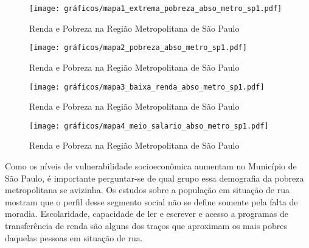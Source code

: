 \documentclass[14pt]{extarticle}
\begin{document}
%
\begin{landscape}
\pagestyle{empty}
\begin{figure}[p]
 \vspace*{-1.2cm}
\centering
	\caption{Renda e Pobreza na Região Metropolitana de São Paulo}
	\texttt{[image: gráficos/mapa1\_extrema\_pobreza\_abso\_metro\_sp1.pdf]}
	\label{fig:mapa_extrema_pobreza}
\end{figure}
\end{landscape}


%
\begin{landscape}
\pagestyle{empty}
\begin{figure}[p]
 \vspace*{-1.2cm}
\centering
	\caption{Renda e Pobreza na Região Metropolitana de São Paulo}
	\texttt{[image: gráficos/mapa2\_pobreza\_abso\_metro\_sp1.pdf]}
	\label{fig:mapa_pobreza}
\end{figure}
\end{landscape}


%
\begin{landscape}
\pagestyle{empty}
\begin{figure}[p]
 \vspace*{-1.2cm}
\centering
	\caption{Renda e Pobreza na Região Metropolitana de São Paulo}
	\texttt{[image: gráficos/mapa3\_baixa\_renda\_abso\_metro\_sp1.pdf]}
	\label{fig:mapa_baixa_renda}
\end{figure}
\end{landscape}


%
\begin{landscape}
\pagestyle{empty}
\begin{figure}[p]
 \vspace*{-1.2cm}
\centering
	\caption{Renda e Pobreza na Região Metropolitana de São Paulo}
	\texttt{[image: gráficos/mapa4\_meio\_salario\_abso\_metro\_sp1.pdf]}
	\label{fig:mapa_meio_salario}
\end{figure}
\end{landscape}

Como os níveis de vulnerabilidade socioeconômica aumentam no Município de São Paulo, é importante perguntar-se de qual grupo essa demografia da pobreza metropolitana se avizinha. Os estudos sobre a população em situação de rua mostram que o perfil desse segmento social não se define somente pela falta de moradia. Escolaridade, capacidade de ler e escrever e acesso a programas de transferência de renda são alguns dos traços que aproximam os mais pobres daquelas pessoas em situação de rua.\\ 
\end{document}

